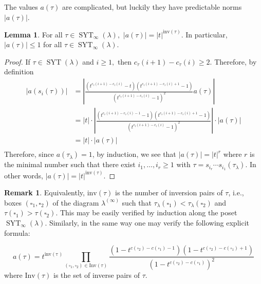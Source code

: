 \documentclass[12pt,reqno]{amsart}
\theoremstyle{definition}
\newtheorem{lem}[thm]{Lemma}
\newtheorem{remark}{Remark}
\DeclareMathOperator{\SYT}{\mathrm{SYT}}
\begin{document}
The values $a(\tau)$ are complicated, but luckily they have predictable norms $|a(\tau)|.$

\begin{lem}\label{lem bounds on norms}
    For all $\tau \in \SYT_{\infty}(\lambda),$ $|a(\tau)| = |t|^{\mathrm{inv}(\tau)}.$ In particular, $|a(\tau)| \leq 1$ for all $\tau \in \SYT_{\infty}(\lambda)$.
\end{lem}
\begin{proof}
    If $\tau \in \SYT(\lambda)$ and $i \geq 1,$ then $c_{\tau}(i+1) - c_{\tau}(i) \geq 2.$ Therefore, by definition 
    \begin{align*}
        |a(s_{i}(\tau))| &= \left| \frac{(t^{c_{\tau}(i+1)- c_{\tau}(i)}-t)(t^{c_{\tau}(i+1)- c_{\tau}(i)+1}-1)}{(t^{c_{\tau}(i+1)- c_{\tau}(i)}-1)^2} a(\tau) \right| 
        \\
        &= |t| \cdot \left| \frac{(t^{c_{\tau}(i+1)- c_{\tau}(i)-1}-1)(t^{c_{\tau}(i+1)- c_{\tau}(i)+1}-1)}{(t^{c_{\tau}(i+1)- c_{\tau}(i)}-1)^2} \right| \cdot |a(\tau)| \\
        &= |t| \cdot |a(\tau)| \\
    \end{align*}
   Therefore, since $a(\tau_{\lambda}) = 1$, by induction, we see that $|a(\tau)| = |t|^r$ where $r$ is the minimal number such that there exist $i_1,\dots,i_r \geq 1$ with $\tau = s_{i_r}\cdots s_{i_1}(\tau_{\lambda}).$ In other words, 
   $|a(\tau)| = |t|^{\mathrm{inv}(\tau)}.$
\end{proof}

\begin{remark}
    Equivalently, $\mathrm{inv}(\tau)$ is the number of inversion pairs of $\tau$, i.e., boxes $(\square_1,\square_2)$ of the diagram $\lambda^{(\infty)}$ such that $\tau_{\lambda}(\square_1) < \tau_{\lambda}(\square_2)$ and $\tau(\square_1) > \tau(\square_2).$ This may be easily verified by induction along the poset $\SYT_{\infty}(\lambda).$ Similarly, in the same way one may verify the following explicit formula:

    $$a(\tau) = t^{\mathrm{inv(\tau)}} \prod_{(\square_1,\square_2) \in \mathrm{Inv}(\tau)}\frac{(1-t^{c(\square_2)-c(\square_1)-1})(1-t^{c(\square_2)-c(\square_1)+1})}{(1-t^{c(\square_2)-c(\square_1)})^2}$$
    where $\mathrm{Inv}(\tau)$ is the set of inverse pairs of $\tau.$
\end{remark}
\end{document}
